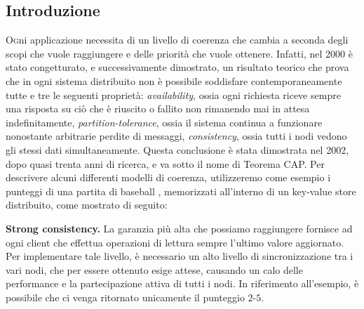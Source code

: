 \documentclass[twoside]{article}
\begin{document}
\begin{multicols}{2} %

\section{Introduzione}
\label{sec:introduzione}
\lettrine[nindent=0em,lines=2]{O} gni applicazione necessita di un livello di coerenza che cambia a seconda degli scopi che vuole raggiungere e delle priorità che vuole ottenere. Infatti, nel 2000 è stato congetturato, e successivamente dimostrato, un risultato teorico che prova che in ogni sistema distribuito non è possibile soddisfare contemporaneamente tutte e tre le seguenti proprietà: \emph{availability}, ossia ogni richiesta riceve sempre una risposta su ciò che è riuscito o fallito non rimanendo mai in attesa indefinitamente, \emph{partition-tolerance}, ossia il sistema continua a funzionare nonostante arbitrarie perdite di messaggi, \emph{consistency}, ossia tutti i nodi vedono gli stessi dati simultaneamente. Questa conclusione è stata dimostrata nel 2002, dopo quasi trenta anni di ricerca, e va sotto il nome di Teorema CAP.
Per descrivere alcuni differenti modelli di coerenza, utilizzeremo come esempio i punteggi di una partita di baseball \cite{bib:baseball}, memorizzati all'interno di un key-value store distribuito, come mostrato di seguito:
\begin{table}[H]
\centering
{}
\caption{Esempio di punteggio nel baseball.}
\label{tab:punteggio-baseball}
\end{table}

\textbf{Strong consistency.} La garanzia più alta che possiamo raggiungere fornisce ad ogni client che effettua operazioni di lettura sempre l'ultimo valore aggiornato. Per implementare tale livello, è necessario un alto livello di sincronizzazione tra i vari nodi, che per essere ottenuto esige attese, causando un calo delle performance e la partecipazione attiva di tutti i nodi. In riferimento all'esempio, è possibile che ci venga ritornato unicamente il punteggio $2$-$5$.


\end{multicols}
\end{document}

